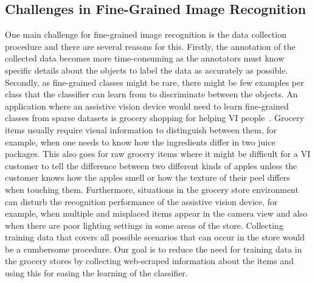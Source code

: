 
\subsection{Challenges in Fine-Grained Image Recognition}


One main challenge for fine-grained image recognition %
is the data collection procedure and there are several reasons for this. 
Firstly, the annotation of the collected data becomes more time-consuming as the annotators must know specific details about the objects to label the data as accurately as possible. Secondly, as fine-grained classes might be rare, there might be few examples per class that the classifier can learn from to discriminate between the objects. An application where an assistive vision device would need to learn fine-grained classes from sparse datasets is grocery shopping for helping VI people~\cite{jafri2014computer, lanigan2006trinetra}. Grocery items usually require visual information to distinguish between them, for example, when one needs to know how the ingredients differ in two juice packages. 
This also goes for raw grocery items where it might be difficult for a VI customer to tell the difference between two different kinds of apples %
unless the customer knows how the apples smell or how the texture of their peel differs when touching them. 
Furthermore, situations in the grocery store environment can disturb the recognition performance of the assistive vision device, for example, when multiple and misplaced items appear in the camera view and also when there are poor lighting settings in some areas of the store. Collecting training data that covers all possible scenarios that can occur in the store would be a cumbersome procedure. Our goal is to reduce the need for training data in the grocery stores by collecting web-scraped information about the items and using this for easing the learning of the classifier. 

